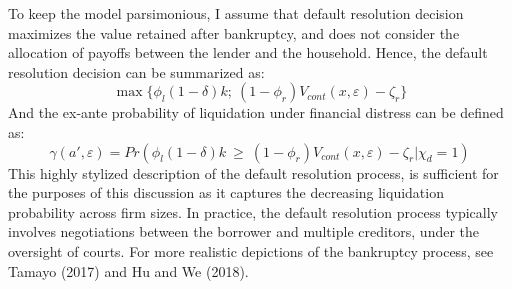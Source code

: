 \documentclass[12pt]{article}
\begin{document}
To keep the model parsimonious, I assume that default resolution decision maximizes the value retained after bankruptcy, and does not consider the allocation of payoffs between the lender and the household. Hence, the default resolution decision can be summarized as: 
\begin{equation} \label{eq:liquidation decision}
    \max \{ \phi_l (1-\delta) k; \ (1-\phi_r) V_{cont}(x,\varepsilon)- \zeta_r  \}
\end{equation}
And the ex-ante probability of liquidation under financial distress can be defined as: 
\begin{equation} \label{eq:liquidation probability}
    \gamma(a', \varepsilon) = Pr(\phi_l (1-\delta) k \ \geq \ (1-\phi_r) V_{cont}(x,\varepsilon) - \zeta_r | \chi_d = 1)
\end{equation} 
This highly stylized description of the default resolution process, is sufficient for the purposes of this discussion as it captures the decreasing liquidation probability across firm sizes. In practice, the default resolution process typically involves negotiations between the borrower and multiple creditors, under the oversight of courts. For more realistic depictions of the bankruptcy process, see Tamayo (2017) and Hu and We (2018).  

 
\end{document}
